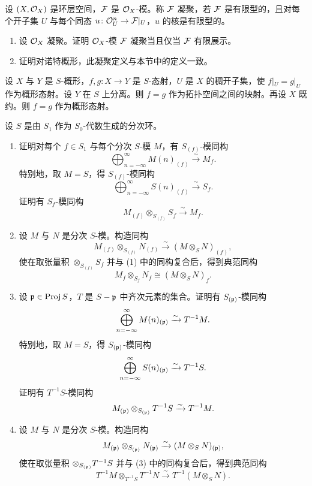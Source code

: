 \begin{exercises}
\item \label{ex:1.4.1} 设 $(X,\mathcal{O}_X)$ 是环层空间，$\mathcal{F}$ 是 $\mathcal{O}_X$-模。称 $\mathcal{F}$ 凝聚，若 $\mathcal{F}$ 是有限型的，且对每个开子集 $U$ 与每个同态 $u\colon\mathcal{O}_U^n\to\mathcal{F}|_U$，$u$ 的核是有限型的。
\begin{enumerate}[label=(\arabic*),leftmargin=2.2em]
  \item 设 $\mathcal{O}_X$ 凝聚。证明 $\mathcal{O}_X$-模 $\mathcal{F}$ 凝聚当且仅当 $\mathcal{F}$ 有限展示。
  \item 证明对诺特概形，此凝聚定义与本节中的定义一致。
\end{enumerate}

\item \label{ex:1.4.2} 设 $X$ 与 $Y$ 是 $S$-概形，$f,g\colon X\to Y$ 是 $S$-态射，$U$ 是 $X$ 的稠开子集，使 $f|_U=g|_U$ 作为概形态射。设 $Y$ 在 $S$ 上分离。则 $f=g$ 作为拓扑空间之间的映射。再设 $X$ 既约。则 $f=g$ 作为概形态射。

\item \label{ex:1.4.3} 设 $S$ 是由 $S_1$ 作为 $S_0$-代数生成的分次环。
\begin{enumerate}[label=(\arabic*),leftmargin=2.2em]
  \item 证明对每个 $f\in S_1$ 与每个分次 $S$-模 $M$，有 $S_{(f)}$-模同构
  \[
  \bigoplus_{n=-\infty}^\infty M(n)_{(f)}\xrightarrow{\sim}M_f.
  \]
  特别地，取 $M=S$，得 $S_{(f)}$-模同构
  \[
  \bigoplus_{n=-\infty}^\infty S(n)_{(f)}\xrightarrow{\sim}S_f.
  \]
  证明有 $S_f$-模同构
  \[
  M_{(f)}\otimes_{S_{(f)}}S_f\xrightarrow{\sim}M_f.
  \]
  \item 设 $M$ 与 $N$ 是分次 $S$-模。构造同构
  \[
  M_{(f)}\otimes_{S_{(f)}}N_{(f)}\xrightarrow{\sim}(M\otimes_SN)_{(f)},
  \]
  使在取张量积 $\otimes_{S_{(f)}}S_f$ 并与 (1) 中的同构复合后，得到典范同构
  \[
  M_f\otimes_{S_f}N_f\cong(M\otimes_SN)_f.
  \]
  \item 设 $\mathfrak{p}\in\operatorname{Proj} S$，$T$ 是 $S-\mathfrak{p}$ 中齐次元素的集合。证明有 $S_{(\mathfrak{p})}$-模同构
  \[
  \bigoplus_{n=-\infty}^\infty M(n)_{(\mathfrak{p})}\xrightarrow{\sim}T^{-1}M.
  \]
  特别地，取 $M=S$，得 $S_{(\mathfrak{p})}$-模同构
  \[
  \bigoplus_{n=-\infty}^\infty S(n)_{(\mathfrak{p})}\xrightarrow{\sim}T^{-1}S.
  \]
  证明有 $T^{-1}S$-模同构
  \[
  M_{(\mathfrak{p})}\otimes_{S_{(\mathfrak{p})}}T^{-1}S\xrightarrow{\sim}T^{-1}M.
  \]
  \item 设 $M$ 与 $N$ 是分次 $S$-模。构造同构
  \[
  M_{(\mathfrak{p})}\otimes_{S_{(\mathfrak{p})}}N_{(\mathfrak{p})}\xrightarrow{\sim}(M\otimes_SN)_{(\mathfrak{p})},
  \]
  使在取张量积 $\otimes_{S_{(\mathfrak{p})}}T^{-1}S$ 并与 (3) 中的同构复合后，得到典范同构
  \[
  T^{-1}M\otimes_{T^{-1}S}T^{-1}N\xrightarrow{\sim}T^{-1}(M\otimes_SN).
  \]
\end{enumerate}


\end{exercises}

